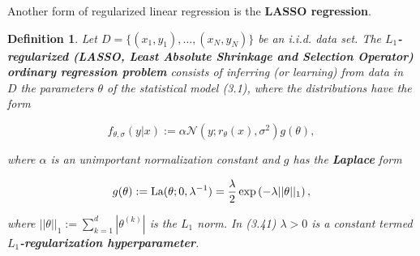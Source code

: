 \documentclass{report}
\newtheorem{definition}{Definition}[chapter]
\begin{document}
Another form of regularized linear regression is the \textbf{LASSO regression}.

\begin{definition}
Let $D = \{(x_1,y_1),\dots,(x_N,y_N)\}$ be an i.i.d. data set. The \textbf{$L_1$-regularized (LASSO, Least Absolute Shrinkage and Selection Operator) ordinary regression problem} consists of inferring (or learning) from data in $D$ the parameters $\theta$ of the statistical model (3.1), where the distributions have the form

\begin{equation}
f_{\theta,\sigma}(y|x) := \alpha\mathcal{N}(y;r_\theta(x),\sigma^2)g(\theta),
\end{equation}

where $\alpha$ is an unimportant normalization constant and $g$ has the \textbf{Laplace} form

\begin{equation}
g(\theta) := \textup{La}(\theta;0,\lambda^{-1}) = \frac{\lambda}{2}\exp\left(-\lambda||\theta||_1\right),
\end{equation}

where $||\theta||_1 := \sum_{k=1}^d |\theta^{(k)}|$ is the $L_1$ norm. In (3.41) $\lambda > 0$ is a constant termed \textbf{$L_1$-regularization hyperparameter}.
\end{definition}
\end{document}
